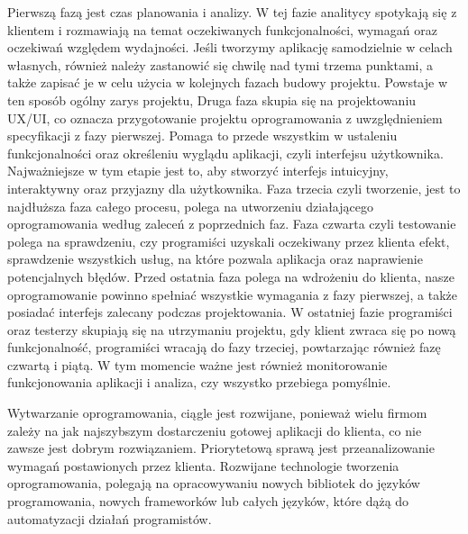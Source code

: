Pierwszą fazą jest czas planowania i analizy. W tej fazie analitycy spotykają się z klientem i rozmawiają na temat oczekiwanych funkcjonalności, wymagań oraz oczekiwań względem wydajności. Jeśli tworzymy aplikację samodzielnie w celach własnych, również należy zastanowić się chwilę nad tymi trzema punktami, a także zapisać je w celu użycia w kolejnych fazach budowy projektu. Powstaje w ten sposób ogólny zarys projektu, Druga faza skupia się na projektowaniu UX/UI, co oznacza przygotowanie projektu oprogramowania z uwzględnieniem specyfikacji z fazy pierwszej. Pomaga to przede wszystkim w ustaleniu funkcjonalności oraz określeniu wyglądu aplikacji, czyli interfejsu użytkownika. Najważniejsze w tym etapie jest to, aby stworzyć interfejs intuicyjny, interaktywny oraz przyjazny dla użytkownika.
Faza trzecia czyli tworzenie, jest to najdłuższa faza całego procesu, polega na utworzeniu działającego oprogramowania według zaleceń z poprzednich faz. Faza czwarta czyli testowanie polega na sprawdzeniu, czy programiści uzyskali oczekiwany przez klienta efekt, sprawdzenie wszystkich usług, na które pozwala aplikacja oraz naprawienie potencjalnych błędów. Przed ostatnia faza polega na wdrożeniu do klienta, nasze oprogramowanie powinno spełniać wszystkie wymagania z fazy pierwszej, a także posiadać interfejs zalecany podczas projektowania. W ostatniej fazie programiści oraz testerzy skupiają się na utrzymaniu projektu, gdy klient zwraca się po nową funkcjonalność, programiści wracają do fazy trzeciej, powtarzając również fazę czwartą i piątą. W tym momencie ważne jest również monitorowanie funkcjonowania aplikacji i analiza, czy wszystko przebiega pomyślnie.

Wytwarzanie oprogramowania, ciągle jest rozwijane, ponieważ wielu firmom zależy na jak najszybszym dostarczeniu gotowej aplikacji do klienta, co nie zawsze jest dobrym rozwiązaniem. Priorytetową sprawą jest przeanalizowanie wymagań postawionych przez klienta. Rozwijane technologie tworzenia oprogramowania, polegają na opracowywaniu nowych bibliotek do języków programowania, nowych frameworków lub całych języków, które dążą do automatyzacji działań programistów.
